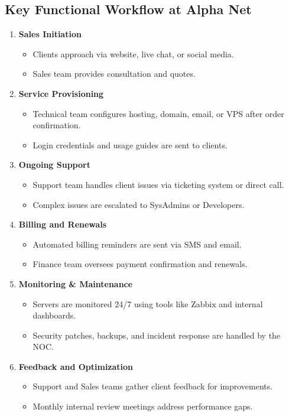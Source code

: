 \subsection{Key Functional Workflow at Alpha Net}
\begin{enumerate}
    \item \textbf{Sales Initiation}
    \begin{itemize}
        \item Clients approach via website, live chat, or social media.
        \item Sales team provides consultation and quotes.
    \end{itemize}
    \item \textbf{Service Provisioning}
    \begin{itemize}
        \item Technical team configures hosting, domain, email, or VPS after order confirmation.
        \item Login credentials and usage guides are sent to clients.
    \end{itemize}
    \item \textbf{Ongoing Support}
    \begin{itemize}
        \item Support team handles client issues via ticketing system or direct call.
        \item Complex issues are escalated to SysAdmins or Developers.
    \end{itemize}
    \item \textbf{Billing and Renewals}
    \begin{itemize}
        \item Automated billing reminders are sent via SMS and email.
        \item Finance team oversees payment confirmation and renewals.
    \end{itemize}
    \item \textbf{Monitoring \& Maintenance}
    \begin{itemize}
        \item Servers are monitored 24/7 using tools like Zabbix and internal dashboards.
        \item Security patches, backups, and incident response are handled by the NOC.
    \end{itemize}
    \item \textbf{Feedback and Optimization}
    \begin{itemize}
        \item Support and Sales teams gather client feedback for improvements.
        \item Monthly internal review meetings address performance gaps.
    \end{itemize}
\end{enumerate}
